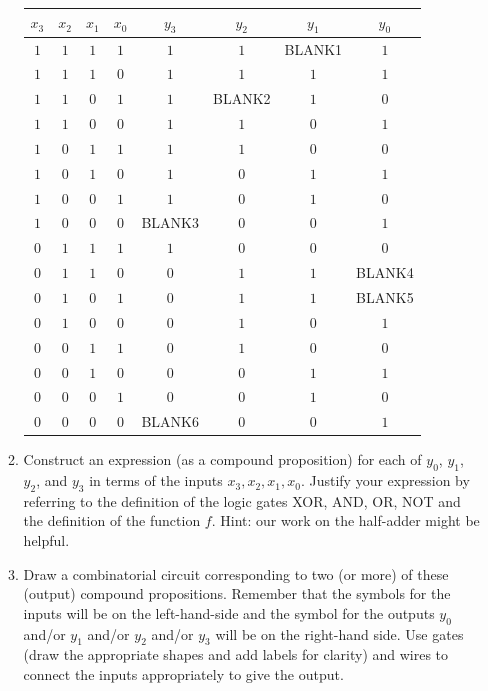 \begin{enumerate}[labelindent=0pt, leftmargin=0pt]
\begin{enumerate}
        \begin{center}
        \begin{tabular}{cccc|cccc}
        $x_3$ & $x_2$ & $x_1$ & $x_0$ & $y_3$ & $y_2$ & $y_1$ & $y_0$\\
        \hline
        $1$ & $1$ & $1$ & $1$ & $1$ & $1$ & BLANK1 & $1$\\
        $1$ & $1$ & $1$ & $0$ & $1$ & $1$ & $1$ & $1$\\
        $1$ & $1$ & $0$ & $1$ & $1$ & BLANK2 & $1$ & $0$\\
        $1$ & $1$ & $0$ & $0$ & $1$ & $1$ & $0$ & $1$\\
        $1$ & $0$ & $1$ & $1$ & $1$ & $1$ & $0$ & $0$\\
        $1$ & $0$ & $1$ & $0$ & $1$ & $0$ & $1$ & $1$\\
        $1$ & $0$ & $0$ & $1$ & $1$ & $0$ & $1$ & $0$\\
        $1$ & $0$ & $0$ & $0$ & BLANK3& $0$ & $0$ & $1$\\
        $0$ & $1$ & $1$ & $1$ & $1$ & $0$ & $0$ & $0$\\
        $0$ & $1$ & $1$ & $0$ & $0$ & $1$ & $1$ & BLANK4\\
        $0$ & $1$ & $0$ & $1$ & $0$ & $1$ & $1$ & BLANK5\\
        $0$ & $1$ & $0$ & $0$ & $0$ & $1$ & $0$ & $1$\\
        $0$ & $0$ & $1$ & $1$ & $0$ & $1$ & $0$ & $0$\\
        $0$ & $0$ & $1$ & $0$ & $0$ & $0$ & $1$ & $1$\\
        $0$ & $0$ & $0$ & $1$ & $0$ & $0$ & $1$ & $0$\\
        $0$ & $0$ & $0$ & $0$ & BLANK6 & $0$ & $0$ & $1$\\
        \end{tabular}
        \end{center}
  
        \item
        Construct an expression (as a compound proposition) for each of $y_0$, $y_1$, $y_2$, and $y_3$ in terms of the inputs 
        $x_3, x_2, x_1, x_0$. Justify your expression by referring to the definition of the logic 
        gates XOR, AND, OR, NOT and the definition of the function $f$. Hint: our work on the half-adder might 
        be helpful.
       
        \item Draw a combinatorial circuit corresponding to two (or more) of these (output) compound propositions.
        Remember that the symbols for the inputs will be on the left-hand-side and 
        the symbol for the outputs $y_0$ and/or $y_1$ and/or $y_2$ and/or $y_3$ will be on the right-hand side. Use gates (draw the appropriate
        shapes and add labels for clarity) and wires to connect the inputs appropriately to give the output.


\end{enumerate}
\end{enumerate}
